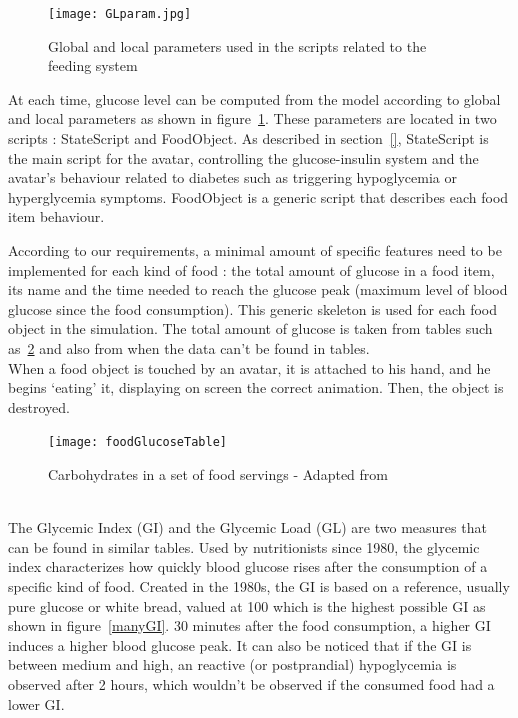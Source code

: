 \begin{figure}[!h]
  \caption{Global and local parameters used in the scripts related to the feeding system}
  \centering
  \texttt{[image: GLparam.jpg]}
  \label{fig:GLparam}
\end{figure}

At each time, glucose level can be computed from the model according to global and local parameters as shown in figure~\ref{fig:GLparam}. These parameters are located in two scripts : StateScript and FoodObject. As described in section~\ref{}, StateScript is the main script for the avatar, controlling the glucose-insulin system and the avatar's behaviour related to diabetes such as triggering hypoglycemia or hyperglycemia symptoms. FoodObject is a generic script that describes each food item behaviour. 

According to our requirements, a minimal amount of specific features need to be implemented for each kind of food : the total amount of glucose in a food item, its name and the time needed to reach the glucose peak (maximum level of blood glucose since the food consumption). This generic skeleton is used for each food object in the simulation. The total amount of glucose is taken from tables such as~\ref{fig:foodGlucoseTable} and also from \cite{nutritiondataWebsite} 
when the data can't be found in tables. \\

When a food object is touched by an avatar, it is attached to his hand, and he begins `eating' it, displaying on screen the correct animation. Then, the object is destroyed.

\iffalse

\begin{figure}[h]
  \caption{Carbohydrates in a set of food servings - Adapted from \cite{foodGlucoseTableWebsite}}
  \centering
  \texttt{[image: foodGlucoseTable]}
  \label{fig:foodGlucoseTable}
\end{figure}


\\
The Glycemic Index (GI) and the Glycemic Load (GL) are two measures %
that can be found in similar tables. Used by nutritionists since 1980, the glycemic index characterizes how quickly blood glucose rises after the consumption of a specific kind of food. 
Created in the 1980s, the GI is based on a reference, usually pure glucose or white bread, valued at 100 which is the highest possible GI as shown in figure~\ref{manyGI}. 30 minutes after the food consumption, a higher GI induces a higher blood glucose peak. It can also be noticed that if the GI is between medium and high, an reactive (or postprandial) hypoglycemia is observed after 2 hours, which wouldn't be observed if the consumed food had a lower GI.

